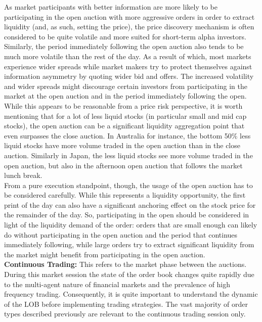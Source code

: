 As market participants with better information are more likely to be participating in the open auction with more aggressive orders in order to extract liquidity (and, as such, setting the price), the price discovery mechanism is often considered to be quite volatile and more suited for short-term alpha investors. Similarly, the period immediately following the open auction also tends to be much more volatile than the rest of the day. As a result of which, most markets experience wider spreads while market makers try to protect themselves against information asymmetry by quoting wider bid and offers. The increased volatility and wider spreads might discourage certain investors from participating in the market at the open auction and in the period immediately following the open. While this appears to be reasonable from a price risk perspective, it is worth mentioning that for a lot of less liquid stocks (in particular small and mid cap stocks), the open auction can be a significant liquidity aggregation point that even surpasses the close auction. In Australia for instance, the bottom 50\% less liquid stocks have more volume traded in the open auction than in the close auction. Similarly in Japan, the less liquid stocks see more volume traded in the open auction, but also in the afternoon open auction that follows the market lunch break.\\


From a pure execution standpoint, though, the usage of the open auction has to be considered carefully. While this represents a liquidity opportunity, the first print of the day can also have a significant anchoring effect on the stock price for the remainder of the day. So, participating in the open should be considered in light of the liquidity demand of the order: orders that are small enough can likely do without participating in the open auction and the period that continues immediately following, while large orders try to extract significant liquidity from the market might benefit from participating in the open auction. \\



\noindent\textbf{Continuous Trading:} This refers to the market phase between the auctions. During this market session  the state of the order book changes quite rapidly due to the multi-agent nature of financial markets and the prevalence of high frequency trading. Consequently, it is quite important to understand the dynamic of the LOB before implementing trading strategies. The vast majority of order types described previously are relevant to the continuous trading session only.\\

